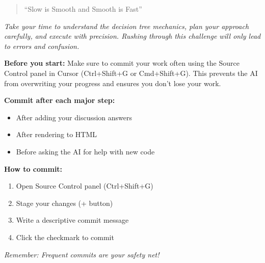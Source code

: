 \documentclass[
  letterpaper,
  DIV=11,
  numbers=noendperiod]{scrartcl}
\providecommand{\tightlist}{%
  \setlength{\itemsep}{0pt}\setlength{\parskip}{0pt}}
\begin{document}
\begin{tcolorbox}[enhanced jigsaw, coltitle=black, colframe=quarto-callout-note-color-frame, bottomtitle=1mm, colbacktitle=quarto-callout-note-color!10!white, breakable, title=\textcolor{quarto-callout-note-color}{\faInfo}\hspace{0.5em}{🎯 Navy SEALs Motto}, rightrule=.15mm, colback=white, titlerule=0mm, arc=.35mm, left=2mm, opacitybacktitle=0.6, leftrule=.75mm, toptitle=1mm, bottomrule=.15mm, toprule=.15mm, opacityback=0]

\begin{quote}
``Slow is Smooth and Smooth is Fast''
\end{quote}

\emph{Take your time to understand the decision tree mechanics, plan
your approach carefully, and execute with precision. Rushing through
this challenge will only lead to errors and confusion.}

\end{tcolorbox}

\begin{tcolorbox}[enhanced jigsaw, coltitle=black, colframe=quarto-callout-warning-color-frame, bottomtitle=1mm, colbacktitle=quarto-callout-warning-color!10!white, breakable, title=\textcolor{quarto-callout-warning-color}{\faExclamationTriangle}\hspace{0.5em}{💾 Important: Save Your Work Frequently!}, rightrule=.15mm, colback=white, titlerule=0mm, arc=.35mm, left=2mm, opacitybacktitle=0.6, leftrule=.75mm, toptitle=1mm, bottomrule=.15mm, toprule=.15mm, opacityback=0]

\textbf{Before you start:} Make sure to commit your work often using the
Source Control panel in Cursor (Ctrl+Shift+G or Cmd+Shift+G). This
prevents the AI from overwriting your progress and ensures you don't
lose your work.

\textbf{Commit after each major step:}

\begin{itemize}
\tightlist
\item
  After adding your discussion answers
\item
  After rendering to HTML
\item
  Before asking the AI for help with new code
\end{itemize}

\textbf{How to commit:}

\begin{enumerate}
\def\labelenumi{\arabic{enumi}.}
\tightlist
\item
  Open Source Control panel (Ctrl+Shift+G)
\item
  Stage your changes (+ button)
\item
  Write a descriptive commit message
\item
  Click the checkmark to commit
\end{enumerate}

\emph{Remember: Frequent commits are your safety net!}

\end{tcolorbox}
\end{document}
